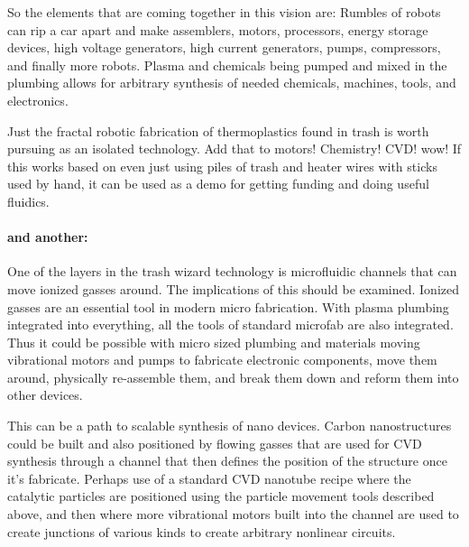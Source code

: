 So the elements that are coming together in this vision are: Rumbles of
robots can rip a car apart and make assemblers, motors, processors,
energy storage devices, high voltage generators, high current
generators, pumps, compressors, and finally more robots. Plasma and
chemicals being pumped and mixed in the plumbing allows for arbitrary
synthesis of needed chemicals, machines, tools, and electronics.

Just the fractal robotic fabrication of thermoplastics found in trash is
worth pursuing as an isolated technology. Add that to motors! Chemistry!
CVD! wow! If this works based on even just using piles of trash and
heater wires with sticks used by hand, it can be used as a demo for
getting funding and doing useful fluidics.

\paragraph{and another:}\label{and-another}

One of the layers in the trash wizard technology is microfluidic
channels that can move ionized gasses around. The implications of this
should be examined. Ionized gasses are an essential tool in modern micro
fabrication. With plasma plumbing integrated into everything, all the
tools of standard microfab are also integrated. Thus it could be
possible with micro sized plumbing and materials moving vibrational
motors and pumps to fabricate electronic components, move them around,
physically re-assemble them, and break them down and reform them into
other devices.

This can be a path to scalable synthesis of nano devices. Carbon
nanostructures could be built and also positioned by flowing gasses that
are used for CVD synthesis through a channel that then defines the
position of the structure once it's fabricate. Perhaps use of a standard
CVD nanotube recipe where the catalytic particles are positioned using
the particle movement tools described above, and then where more
vibrational motors built into the channel are used to create junctions
of various kinds to create arbitrary nonlinear circuits.

